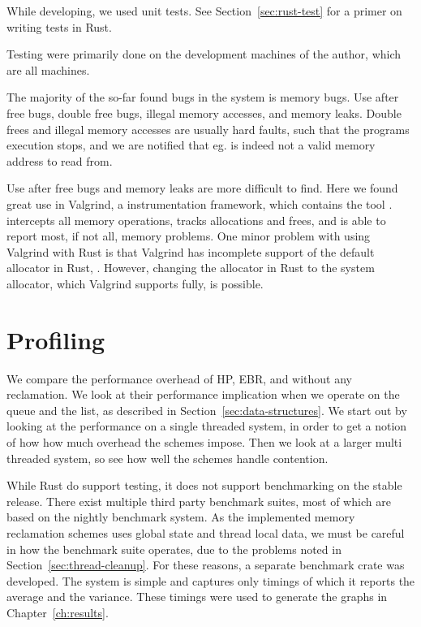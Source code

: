 \documentclass[b5paper]{report}
\begin{document}
While developing, we used unit tests. See Section~\ref{sec:rust-test} for a
primer on writing tests in Rust.

Testing were primarily done on the development machines of the author, which are
all  machines. 

The majority of the so-far found bugs in the system is memory bugs. Use after
free bugs, double free bugs, illegal memory accesses, and memory leaks. Double
frees and illegal memory accesses are usually hard faults, such that the
programs execution stops, and we are notified that eg.  is indeed not
a valid memory address to read from.

Use after free bugs and memory leaks are more difficult to find. Here we found
great use in Valgrind\cite{valgrind}, a instrumentation framework, which
contains the tool .  intercepts all memory
operations, tracks allocations and frees, and is able to report most, if not
all, memory problems. One minor problem with using Valgrind with Rust is that
Valgrind has incomplete support of the default allocator in Rust,
\cite{jemalloc}. However, changing the allocator in Rust to the system
allocator, which Valgrind supports fully, is possible.



\section{Profiling}

We compare the performance overhead of HP, EBR, and without any reclamation. We
look at their performance implication when we operate on the queue and the list,
as described in Section~\ref{sec:data-structures}. We start out by looking at
the performance on a single threaded system, in order to get a notion of how how
much overhead the schemes impose. Then we look at a larger multi threaded system,
so see how well the schemes handle contention. 


 While Rust do support testing, it does not
support benchmarking on the stable release. There exist multiple third party
benchmark suites, most of which are based on the nightly benchmark system. As
the implemented memory reclamation schemes uses global state and thread local
data, we must be careful in how the benchmark suite operates, due to the
problems noted in Section~\ref{sec:thread-cleanup}.  For these reasons, a
separate benchmark crate was developed. The system is simple and captures only
timings of which it reports the average and the variance. These timings were
used to generate the graphs in Chapter~\ref{ch:results}.
\end{document}
